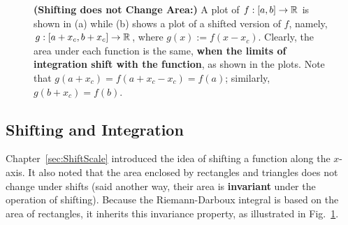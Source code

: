 \Qed

\begin{figure}[htb]%
\centering
\hfill{}%
\hfill
\hfill{}%
    \caption[]{
    \textbf{(Shifting does not Change Area:)} A plot of $f:[a, b] \to \mathbb R$ is shown in (a) while (b) shows a plot of a shifted version of $f$, namely, $g:[a + x_c, b + x_c] \to \mathbb R$, where $g(x):=f(x-x_c)$. Clearly, the area under each function is the same, \textbf{when the limits of integration shift with the function}, as shown in the plots. Note that $g(a + x_c) = f(a + x_c - x_c) = f(a)$; similarly, $g(b + x_c) = f(b)$.
    }
    \label{fig:ShitingAndIntegration}
\end{figure}

\subsection{Shifting and Integration}

Chapter~\ref{sec:ShiftScale} introduced the idea of shifting a function along the $x$-axis. It also noted that the area enclosed by rectangles and triangles does not change under shifts (said another way, their area is \textbf{invariant} under the operation of shifting). Because the Riemann-Darboux integral is based on the area of rectangles, it inherits this invariance property, as illustrated in Fig.~\ref{fig:ShitingAndIntegration}.

